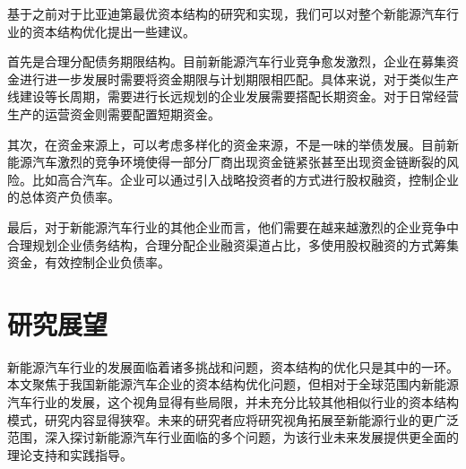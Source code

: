 基于之前对于比亚迪第最优资本结构的研究和实现，我们可以对整个新能源汽车行业的资本结构优化提出一些建议。

首先是合理分配债务期限结构。目前新能源汽车行业竞争愈发激烈，企业在募集资金进行进一步发展时需要将资金期限与计划期限相匹配。具体来说，对于类似生产线建设等长周期，需要进行长远规划的企业发展需要搭配长期资金。对于日常经营生产的运营资金则需要配置短期资金。

其次，在资金来源上，可以考虑多样化的资金来源，不是一味的举债发展。目前新能源汽车激烈的竞争环境使得一部分厂商出现资金链紧张甚至出现资金链断裂的风险。比如高合汽车。企业可以通过引入战略投资者的方式进行股权融资，控制企业的总体资产负债率。

最后，对于新能源汽车行业的其他企业而言，他们需要在越来越激烈的企业竞争中合理规划企业债务结构，合理分配企业融资渠道占比，多使用股权融资的方式筹集资金，有效控制企业负债率。
\section{研究展望}
新能源汽车行业的发展面临着诸多挑战和问题，资本结构的优化只是其中的一环。本文聚焦于我国新能源汽车企业的资本结构优化问题，但相对于全球范围内新能源汽车行业的发展，这个视角显得有些局限，并未充分比较其他相似行业的资本结构模式，研究内容显得狭窄。未来的研究者应将研究视角拓展至新能源行业的更广泛范围，深入探讨新能源汽车行业面临的多个问题，为该行业未来发展提供更全面的理论支持和实践指导。